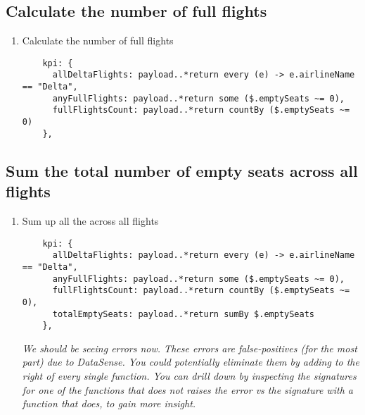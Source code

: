 \subsection{Calculate the number of full flights}
\begin{enumerate}[resume*]
\item Calculate the number of full flights
  \begin{verbatim}
    kpi: {
      allDeltaFlights: payload..*return every (e) -> e.airlineName == "Delta",
      anyFullFlights: payload..*return some ($.emptySeats ~= 0),
      fullFlightsCount: payload..*return countBy ($.emptySeats ~= 0)
    },
  \end{verbatim}
\end{enumerate}

\subsection{Sum the total number of empty seats across all flights}
\begin{enumerate}[resume*]
\item Sum up all the  across all flights
  \begin{verbatim}
    kpi: {
      allDeltaFlights: payload..*return every (e) -> e.airlineName == "Delta",
      anyFullFlights: payload..*return some ($.emptySeats ~= 0),
      fullFlightsCount: payload..*return countBy ($.emptySeats ~= 0),
      totalEmptySeats: payload..*return sumBy $.emptySeats
    },    
  \end{verbatim}
  \emph{
    We should be seeing errors now.  These errors are false-positives (for the most part) due to DataSense.  You could potentially eliminate them by adding  to the right of every single  function.  You can drill down by inspecting the signatures for one of the functions that does not raises the error vs the signature with a function that does, to gain more insight. 
  }
\end{enumerate}
